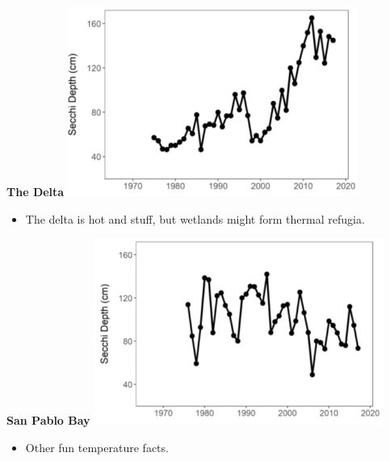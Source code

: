 \documentclass[]{article}\usepackage[]{graphicx}\usepackage[]{color}
\begin{document}
\vspace{1cm}

\begin{Row}
  \begin{Cell}{7}
    \begin{center}
      {\bf {\large The Delta}}
      \includegraphics[width=9.5cm,align=m]{figures/temperature/temp_delta_tmp.png}
      \vspace{0.5cm}
      \begin{itemize}[leftmargin=2cm,rightmargin=0.5cm]
        \item The delta is hot and stuff, but wetlands might form thermal refugia.
      \end{itemize}
    \end{center}
  \end{Cell}
  \begin{Cell}{6}
    \begin{center}
      {\bf {\large San Pablo Bay}}
      \includegraphics[width=9.5cm,align=m]{figures/temperature/temp_san_pablo_bay_tmp.png}
      \vspace{0.5cm}
      \begin{itemize}[leftmargin=2cm,rightmargin=0.5cm]
        \item Other fun temperature facts.
      \end{itemize}
    \end{center}
  \end{Cell}
\end{Row}
\end{document}
